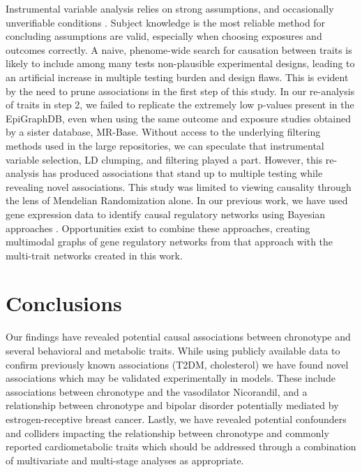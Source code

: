 \documentclass[journal,article,submit,moreauthors,pdftex]{Definitions/mdpi}
\begin{document}
Instrumental variable analysis relies on strong assumptions, and occasionally unverifiable conditions \cite{labrecqueUnderstandingAssumptionsUnderlying2018}. Subject knowledge is the most reliable method for concluding assumptions are valid, especially when choosing exposures and outcomes correctly. A naive, phenome-wide search for causation between traits is likely to include among many tests non-plausible experimental designs, leading to an artificial increase in multiple testing burden and design flaws. This is evident by the need to prune associations in the first step of this study. In our re-analysis of traits in step 2, we failed to replicate the extremely low p-values present in the EpiGraphDB, even when using the same outcome and exposure studies obtained by a sister database, MR-Base. Without access to the underlying filtering methods used in the large repositories, we can speculate that instrumental variable selection, LD clumping, and filtering played a part. However, this re-analysis has produced associations that stand up to multiple testing while revealing novel associations. This study was limited to viewing causality through the lens of Mendelian Randomization alone. In our previous work, we have used gene expression data to identify causal regulatory networks using Bayesian approaches \cite{Aziz_2020}. Opportunities exist to combine these approaches, creating multimodal graphs of gene regulatory networks from that approach with the multi-trait networks created in this work. 

\section{Conclusions}
Our findings have revealed potential causal associations between chronotype and several behavioral and metabolic traits. While using publicly available data to confirm previously known associations (T2DM, cholesterol) we have found novel associations which may be validated experimentally in models. These include associations between chronotype and the vasodilator Nicorandil, and a relationship between chronotype and bipolar disorder potentially mediated by estrogen-receptive breast cancer. Lastly, we have revealed potential confounders and colliders impacting the relationship between chronotype and commonly reported cardiometabolic traits which should be addressed through a combination of multivariate and multi-stage analyses as appropriate.
\end{document}
